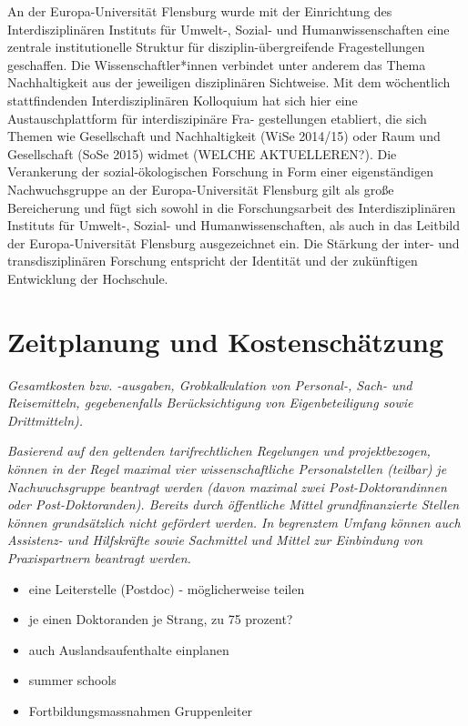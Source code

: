 \documentclass[a4paper,11pt,twoside]{scrartcl}
\begin{document}
An der Europa-Universität Flensburg wurde mit der Einrichtung des Interdisziplinären Instituts für Umwelt-, Sozial- und Humanwissenschaften eine zentrale institutionelle Struktur für disziplin-übergreifende Fragestellungen geschaffen. Die Wissenschaftler*innen verbindet unter anderem das Thema Nachhaltigkeit aus der jeweiligen disziplinären Sichtweise. Mit dem wöchentlich stattfindenden Interdisziplinären Kolloquium hat sich hier eine Austauschplattform für interdiszipinäre Fra-
gestellungen etabliert, die sich Themen wie Gesellschaft und Nachhaltigkeit (WiSe 2014/15) oder Raum und Gesellschaft (SoSe 2015) widmet (WELCHE AKTUELLEREN?). Die Verankerung der sozial-ökologischen Forschung in Form einer eigenständigen Nachwuchsgruppe an der Europa-Universität Flensburg gilt als große Bereicherung und fügt sich sowohl in die Forschungsarbeit des Interdisziplinären Instituts für Umwelt-, Sozial- und Humanwissenschaften, als auch in das Leitbild der Europa-Universität Flensburg ausgezeichnet ein. Die Stärkung der inter- und transdisziplinären Forschung entspricht der Identität und der zukünftigen Entwicklung der Hochschule.







\section{Zeitplanung und Kostenschätzung}
\textit{Gesamtkosten bzw. -ausgaben, Grobkalkulation von Personal-, Sach- und Reisemitteln, gegebenenfalls Berücksichtigung von Eigenbeteiligung sowie Drittmitteln).}

\textit{Basierend auf den geltenden tarifrechtlichen Regelungen und projektbezogen, können in der Regel maximal vier wissenschaftliche Personalstellen (teilbar) je Nachwuchsgruppe beantragt werden (davon maximal zwei Post-Doktorandinnen oder Post-Doktoranden). Bereits durch öffentliche Mittel grundfinanzierte Stellen können grundsätzlich nicht gefördert werden.
In begrenztem Umfang können auch Assistenz- und Hilfskräfte sowie Sachmittel und Mittel zur Einbindung von Praxispartnern beantragt werden.}
\begin{itemize}
    \item eine Leiterstelle (Postdoc) - möglicherweise teilen
    \item je einen Doktoranden je Strang, zu 75 prozent?
    \item auch Auslandsaufenthalte einplanen
    \item summer schools
    \item Fortbildungsmassnahmen Gruppenleiter
\end{itemize}
\end{document}
